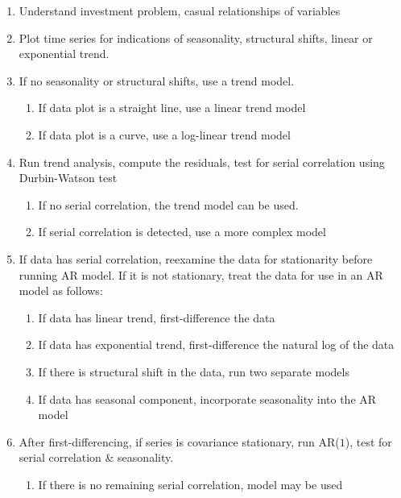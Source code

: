 \begin{definition} 
\begin{enumerate}[label=\roman*.]
\setlength{\itemsep}{0pt}
\item Understand investment problem, casual relationships of variables
\item Plot time series for indications of seasonality, structural shifts, linear or exponential trend.
\item If no seasonality or structural shifts, use a trend model.
\begin{enumerate}[label=\arabic*.]
\setlength{\itemsep}{0pt}
\item If data plot is a straight line, use a linear trend model
\item If data plot is a curve, use a log-linear trend model
\end{enumerate}
\item Run trend analysis, compute the residuals, test for serial correlation using Durbin-Watson test
\begin{enumerate}[label=\arabic*.]
\setlength{\itemsep}{0pt}
\item If no serial correlation, the trend model can be used.
\item If serial correlation is detected, use a more complex model
\end{enumerate}
\item If data has serial correlation, reexamine the data for stationarity before running AR model. If it is not stationary, treat the data for use in an AR model as follows:
\begin{enumerate}[label=\arabic*.]
\setlength{\itemsep}{0pt}
\item If data has linear trend, first-difference the data
\item If data has exponential trend, first-difference the natural log of the data
\item If there is structural shift in the data, run two separate models
\item If data has seasonal component, incorporate seasonality into the AR model
\end{enumerate}
\item After first-differencing, if series is covariance stationary, run AR($1$), test for serial correlation \& seasonality.
\begin{enumerate}[label=\arabic*.]
\setlength{\itemsep}{0pt}
\item If there is no remaining serial correlation, model may be used

\end{enumerate}
\end{enumerate}
\end{definition}
